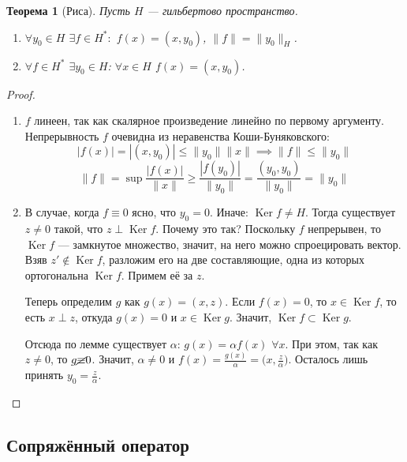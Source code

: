 \documentclass[11pt,openany,a4paper]{scrartcl}
\theoremstyle{plain}
\newtheorem{theorem}{Теорема}[subsection]
\theoremstyle{definition}
\DeclareMathOperator{\Ker}{Ker}
\begin{document}
\begin{theorem}[Риса]
    Пусть $H$ — гильбертово пространство.
    \begin{enumerate}
        \item $\forall y_0 \in H$ $\exists f \in H^\ast:$ $f(x) = (x, y_0)$,
        $\|f\| = \|y_0\|_H$.
        \item $\forall f \in H^\ast$ $\exists y_0 \in H$: $\forall x \in H$
        $f(x) = (x, y_0)$.
    \end{enumerate}
\end{theorem}
\begin{proof}
\mbox{}
    \begin{enumerate}
        \item $f$ линеен, так как скалярное произведение линейно по первому 
        аргументу. Непрерывность $f$ очевидна из неравенства Коши-Буняковского:
        $$
        |f(x)| = |(x, y_0)| \leqslant \|y_0\|\|x\| \implies
        \|f\| \leqslant \|y_0\|
        $$
        $$
        \|f\| = \sup \frac{|f(x)|}{\|x\|} \geqslant \frac{|f(y_0)|}{\|y_0\|} =
        \frac{(y_0, y_0)}{\|y_0\|} = \|y_0\|
        $$
        \item В случае, когда $f \equiv 0$ ясно, что $y_0 = 0$.
        Иначе: $\Ker f \neq H$. Тогда существует $z \neq 0$ такой, что
        $z \perp \Ker f$. Почему это так? Поскольку $f$ непрерывен, то $\Ker f$ —
        замкнутое множество, значит, на него можно спроецировать вектор. Взяв
        $z' \notin \Ker f$, разложим его на две составляющие, одна из которых
        ортогональна $\Ker f$. Примем её за $z$.
        
        Теперь определим $g$ как $g(x) = (x, z)$. Если $f(x) = 0$, то
        $x \in \Ker f$, то есть $x \perp z$, откуда $g(x) = 0$ и $x \in \Ker g$.
        Значит, $\Ker f \subset \Ker g$.
        
        Отсюда по лемме существует $\alpha$: $g(x) = \alpha f(x)$ $\forall x$. При этом,
        так как $z \neq 0$, то $g\cancel \equiv 0$. Значит, $\alpha \neq 0$ и
        $f(x) = \frac{g(x)}{\alpha} = \Big(x, \frac{z}{\alpha}\Big)$. Осталось лишь принять
        $y_0 = \frac{z}{\alpha}$.
    \end{enumerate}
\end{proof}

\subsection{Сопряжённый оператор}
\end{document}
